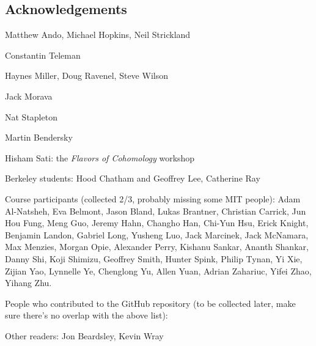 


\newpage

\subsection*{Acknowledgements}

Matthew Ando, Michael Hopkins, Neil Strickland

Constantin Teleman

Haynes Miller, Doug Ravenel, Steve Wilson

Jack Morava

Nat Stapleton

Martin Bendersky



Hisham Sati: the \textit{Flavors of Cohomology} workshop

Berkeley students: Hood Chatham and Geoffrey Lee, Catherine Ray

Course participants (collected 2/3, probably missing some MIT people): Adam Al-Natsheh, Eva Belmont, Jason Bland, Lukas Brantner, Christian Carrick, Jun Hou Fung, Meng Guo, Jeremy Hahn, Changho Han, Chi-Yun Hsu, Erick Knight, Benjamin Landon, Gabriel Long, Yusheng Luo, Jack Marcinek, Jack McNamara, Max Menzies, Morgan Opie, Alexander Perry, Kishanu Sankar, Ananth Shankar, Danny Shi, Koji Shimizu, Geoffrey Smith, Hunter Spink, Philip Tynan, Yi Xie, Zijian Yao, Lynnelle Ye, Chenglong Yu, Allen Yuan, Adrian Zahariuc, Yifei Zhao, Yihang Zhu.

People who contributed to the GitHub repository (to be collected later, make sure there's no overlap with the above list): 

Other readers: Jon Beardsley, Kevin Wray
